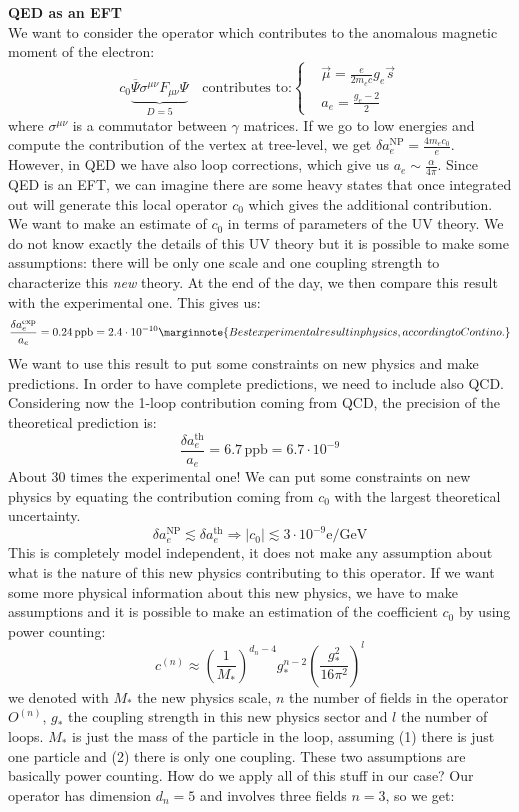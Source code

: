\documentclass[../main.tex]{subfiles}
\begin{document}
\begin{example}\textbf{QED as an EFT}\\
We want to consider the operator which contributes to the anomalous magnetic moment of the electron:
\[
c_0\underbrace{\overline{\Psi}\sigma^{\mu\nu}F_{\mu\nu}\Psi}_{D=5}\quad\text{contributes to:}\left\{\begin{aligned}
&\Vec{\mu}=\frac{e}{2m_ec}g_e\Vec{s}\\
&a_e=\frac{g_e-2}{2}
\end{aligned}\right.
\]
where $\sigma^{\mu\nu}$ is a commutator between $\gamma$ matrices. If we go to low energies and compute the contribution of the vertex at tree-level, we get $\delta a_e^{\text{NP}}=\frac{4m_ec_0}{e}$. However, in QED we have also loop corrections, which give us $a_e\sim\frac{\alpha}{4\pi}$. Since QED is an EFT, we can imagine there are some heavy states that once integrated out will generate this local operator $c_0$ which gives the additional contribution. We want to make an estimate of $c_0$ in terms of parameters of the UV theory. We do not know exactly the details of this UV theory but it is possible to make some assumptions: there will be only one scale and one coupling strength to characterize this \textit{new} theory. At the end of the day, we then compare this result with the experimental one. This gives us:
\[
\frac{\delta a_e^{\text{exp}}}{a_e}=0.24\,\text{ppb}=2.4\cdot10^{-10}\marginnote{Best experimental result in physics, according to Contino.}
\]
We want to use this result to put some constraints on new physics and make predictions. In order to have complete predictions, we need to include also QCD. Considering now the 1-loop contribution coming from QCD, the precision of the theoretical prediction is:
\[
\frac{\delta a_e^{\text{th}}}{a_e}=6.7\,\text{ppb}=6.7\cdot10^{-9}
\]
About 30 times the experimental one! We can put some constraints on new physics by equating the contribution coming from $c_0$ with the largest theoretical uncertainty.
\[
\delta a_e^{\text{NP}}\lesssim\delta a_e^{\text{th}}\Rightarrow|c_0|\lesssim3\cdot10^{-9} \text{e/GeV}
\]
This is completely model independent, it does not make any assumption about what is the nature of this new physics contributing to this operator. If we want some more physical information about this new physics, we have to make assumptions and it is possible to make an estimation of the coefficient $c_0$ by using power counting:
\[
c^{(n)}\approx\left(\frac{1}{M_*}\right)^{d_n-4}g_*^{n-2}\left(\frac{g_*^2}{16\pi^2}\right)^l
\]
we denoted with $M_*$ the new physics scale, $n$ the number of fields in the operator $O^{(n)}$, $g_*$ the coupling strength in this new physics sector and $l$ the number of loops. $M_*$ is just the mass of the particle in the loop, assuming (1) there is just one particle and (2) there is only one coupling. These two assumptions are basically power counting. How do we apply all of this stuff in our case? Our operator has dimension $d_n=5$ and involves three fields $n=3$, so we get:

\end{example}
\end{document}
